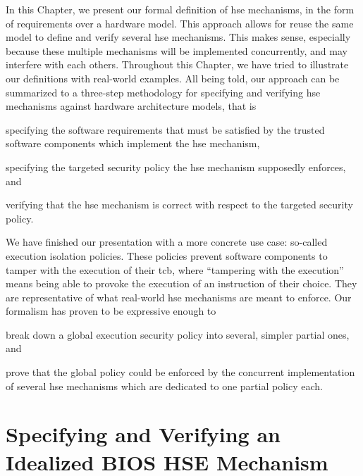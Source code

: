 In this Chapter, we present our formal definition of \ac{hse} mechanisms, in the
form of requirements over a hardware model.
%
This approach allows for reuse the same model to define and verify several
\ac{hse} mechanisms.
%
This makes sense, especially because these multiple mechanisms will be
implemented concurrently, and may interfere with each others.
%
Throughout this Chapter, we have tried to illustrate our definitions with
real-world examples.
%
All being told, our approach can be summarized to a three-step methodology for
specifying and verifying \ac{hse} mechanisms against hardware architecture
models, that is
%
\begin{inparaenum}[(1)]
\item specifying the software requirements that must be satisfied by the trusted
  software components which implement the \ac{hse} mechanism,
%
\item specifying the targeted security policy the \ac{hse} mechanism supposedly
  enforces, and
%
\item verifying that the \ac{hse} mechanism is correct with respect to the
  targeted security policy.
\end{inparaenum}

We have finished our presentation with a more concrete use case: so-called
execution isolation policies.
%
These policies prevent software components to tamper with the execution of their
\ac{tcb}, where ``tampering with the execution'' means being able to provoke the
execution of an instruction of their choice.
%
They are representative of what real-world \ac{hse} mechanisms are meant to
enforce.
%
Our formalism has proven to be expressive enough to
%
\begin{inparaenum}[(1)]
\item break down a global execution security policy into several, simpler
  partial ones, and
%
\item prove that the global policy could be enforced by the concurrent
  implementation of several \ac{hse} mechanisms which are dedicated to one
  partial policy each.
\end{inparaenum}

\chapter{Specifying and Verifying an Idealized BIOS HSE Mechanism}



